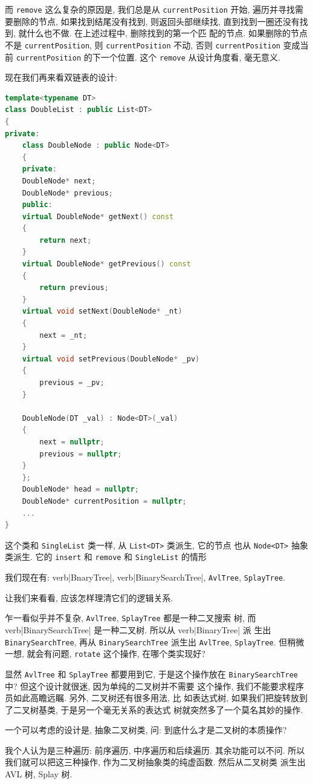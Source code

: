 \documentclass[a4paper]{ctexart}
\theoremstyle{definition}
\theoremstyle{definition}
\begin{document}
而 \verb|remove| 这么复杂的原因是, 我们总是从 \verb|currentPosition|
开始, 遍历并寻找需要删除的节点, 如果找到结尾没有找到, 则返回头部继续找,
直到找到一圈还没有找到, 就什么也不做. 在上述过程中, 删除找到的第一个匹
配的节点. 如果删除的节点不是 \verb|currentPosition|, 则
\verb|currentPosition| 不动, 否则 \verb|currentPosition| 变成当前
\verb|currentPosition| 的下一个位置. 这个 \verb|remove| 从设计角度看,
毫无意义.

现在我们再来看双链表的设计:
\begin{lstlisting}[language=C++]
template<typename DT>
class DoubleList : public List<DT>
{
private:
    class DoubleNode : public Node<DT>
    {
    private:
	DoubleNode* next;
	DoubleNode* previous;
    public:
	virtual DoubleNode* getNext() const
	{
	    return next;
	}
	virtual DoubleNode* getPrevious() const
	{
	    return previous;
	}
	virtual void setNext(DoubleNode* _nt)
	{
	    next = _nt;
	}
	virtual void setPrevious(DoubleNode* _pv)
	{
	    previous = _pv;
	}
		
	DoubleNode(DT _val) : Node<DT>(_val)
	{
	    next = nullptr;
	    previous = nullptr;
	}
    };
    DoubleNode* head = nullptr;
    DoubleNode* currentPosition = nullptr;
    ...
}
\end{lstlisting}

这个类和 \verb|SingleList| 类一样, 从 \verb|List<DT>| 类派生, 它的节点
也从 \verb|Node<DT>| 抽象类派生. 它的 \verb|insert| 和 \verb|remove| 和 \verb|SingleList| 的情形

我们现在有: verb|BnaryTree|,
verb|BinarySearchTree|, \verb|AvlTree|, \verb|SplayTree|.

让我们来看看, 应该怎样理清它们的逻辑关系.

乍一看似乎并不复杂, \verb|AvlTree|, \verb|SplayTree| 都是一种二叉搜索
树, 而 verb|BinarySearchTree| 是一种二叉树. 所以从 verb|BinaryTree| 派
生出 \verb|BinarySearchTree|, 再从 \verb|BinarySearchTree| 派生出
\verb|AvlTree|, \verb|SplayTree|. 但稍微一想, 就会有问题,
\verb|rotate| 这个操作, 在哪个类实现好?

显然 \verb|AvlTree| 和 \verb|SplayTree| 都要用到它, 于是这个操作放在
\verb|BinarySearchTree| 中? 但这个设计就很迷, 因为单纯的二叉树并不需要
这个操作, 我们不能要求程序员如此高瞻远瞩. 另外, 二叉树还有很多用法, 比
如表达式树, 如果我们把旋转放到了二叉树基类, 于是另一个毫无关系的表达式
树就突然多了一个莫名其妙的操作.

一个可以考虑的设计是, 抽象二叉树类, 问: 到底什么才是二叉树的本质操作?

我个人认为是三种遍历: 前序遍历, 中序遍历和后续遍历. 其余功能可以不问.
所以我们就可以把这三种操作, 作为二叉树抽象类的纯虚函数. 然后从二叉树类
派生出 AVL 树, Splay 树.
\end{document}
